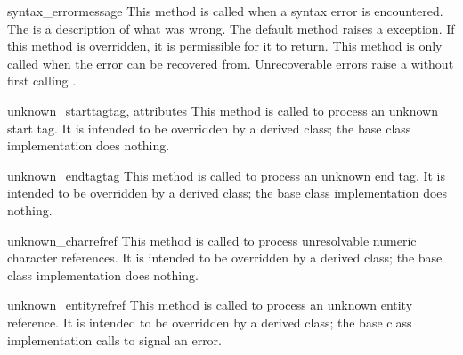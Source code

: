 \begin{methoddesc}{syntax_error}{message}
This method is called when a syntax error is encountered.  The
 is a description of what was wrong.  The default method 
raises a  exception.  If this method is
overridden, it is permissible for it to return.  This method is only
called when the error can be recovered from.  Unrecoverable errors
raise a  without first calling
.
\end{methoddesc}

\begin{methoddesc}{unknown_starttag}{tag, attributes}
This method is called to process an unknown start tag.  It is intended
to be overridden by a derived class; the base class implementation
does nothing.
\end{methoddesc}

\begin{methoddesc}{unknown_endtag}{tag}
This method is called to process an unknown end tag.  It is intended
to be overridden by a derived class; the base class implementation
does nothing.
\end{methoddesc}

\begin{methoddesc}{unknown_charref}{ref}
This method is called to process unresolvable numeric character
references.  It is intended to be overridden by a derived class; the
base class implementation does nothing.
\end{methoddesc}

\begin{methoddesc}{unknown_entityref}{ref}
This method is called to process an unknown entity reference.  It is
intended to be overridden by a derived class; the base class
implementation calls  to signal an error.
\end{methoddesc}


\begin{seealso}


\end{seealso}


